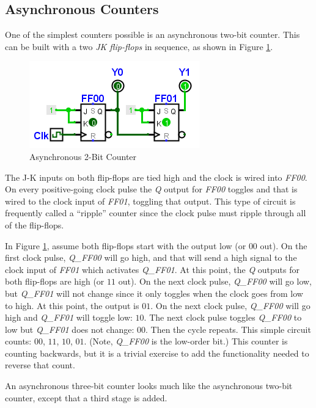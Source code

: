 \subsection{Asynchronous Counters}
\label{SL:subsec:asynchronous_counters}

One of the simplest counters possible is an asynchronous two-bit counter. This can be built with a two \emph{JK flip-flops} in sequence, as shown in Figure \ref{fig:09_10}.

\begin{figure}[H]
	\centering
	\includegraphics[width=\maxwidth{.95\linewidth}]{gfx/09_10}
	\caption{Asynchronous 2-Bit Counter}
	\label{fig:09_10}
\end{figure}

The J-K inputs on both flip-flops are tied high and the clock is wired into \emph{FF00}. On every positive-going clock pulse the \emph{Q} output for \emph{FF00} toggles and that is wired to the clock input of \emph{FF01}, toggling that output. This type of circuit is frequently called a ``ripple'' counter since the clock pulse must ripple through all of the flip-flops.

In Figure \ref{fig:09_10}, assume both flip-flops start with the output low (or $ 00 $ out). On the first clock pulse, \emph{Q\_FF00} will go high, and that will send a high signal to the clock input of \emph{FF01} which activates \emph{Q\_FF01}. At this point, the \emph{Q} outputs for both flip-flops are high (or $ 11 $ out). On the next clock pulse, \emph{Q\_FF00} will go low, but \emph{Q\_FF01} will not change since it only toggles when the clock goes from low to high. At this point, the output is $ 01 $. On the next clock pulse, \emph{Q\_FF00} will go high and \emph{Q\_FF01} will toggle low: $ 10 $. The next clock pulse toggles \emph{Q\_FF00} to low but \emph{Q\_FF01} does not change: $ 00 $. Then the cycle repeats. This simple circuit counts: $ 00 $, $ 11 $, $ 10 $, $ 01 $. (Note, \emph{Q\_FF00} is the low-order bit.) This counter is counting backwards, but it is a trivial exercise to add the functionality needed to reverse that count.

An asynchronous three-bit counter looks much like the asynchronous two-bit counter, except that a third stage is added.

